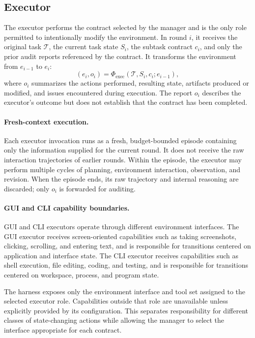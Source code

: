 \subsection{Executor}
\label{sec:method:executor}

The executor performs the contract selected by the manager and is the
only role permitted to intentionally modify the environment. In round
$i$, it receives the original task $\mathcal{T}$, the current task
state $S_i$, the subtask contract $c_i$, and only the prior audit
reports referenced by the contract. It transforms the environment from
$e_{i-1}$ to $e_i$:
\begin{equation}
\label{eq:executor}
(e_i,o_i)
=
\Phi_{\mathrm{exec}}
\left(
\mathcal{T},
S_i,
c_i;
e_{i-1}
\right),
\end{equation}
where $o_i$ summarizes the actions performed, resulting state,
artifacts produced or modified, and issues encountered during
execution. The report $o_i$ describes the executor's outcome but does
not establish that the contract has been completed.

\paragraph{Fresh-context execution.}
Each executor invocation runs as a fresh, budget-bounded episode
containing only the information supplied for the current round. It does
not receive the raw interaction trajectories of earlier rounds. Within
the episode, the executor may perform multiple cycles of planning,
environment interaction, observation, and revision. When the episode
ends, its raw trajectory and internal reasoning are discarded; only
$o_i$ is forwarded for auditing.

\paragraph{GUI and CLI capability boundaries.}
GUI and CLI executors operate through different environment interfaces.
The GUI executor receives screen-oriented capabilities such as taking
screenshots, clicking, scrolling, and entering text, and is responsible
for transitions centered on application and interface state. The CLI
executor receives capabilities such as shell execution, file editing,
coding, and testing, and is responsible for transitions centered on
workspace, process, and program state.

The harness exposes only the environment interface and tool set
assigned to the selected executor role. Capabilities outside that role
are unavailable unless explicitly provided by its configuration. This
separates responsibility for different classes of state-changing
actions while allowing the manager to select the interface appropriate
for each contract.

